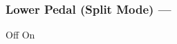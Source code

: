 \subsubsection[Lower Pedal (Split)]{Lower Pedal (Split Mode) --- \UiKey{\SET}}









































Off
On
